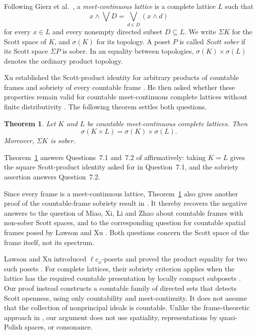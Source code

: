 \documentclass[preprint,11pt]{elsarticle}
\newtheorem{theorem}{Theorem}[section]
\theoremstyle{definition}
\theoremstyle{remark}
\numberwithin{equation}{section}
\newcommand{\Sc}{\sigma}
\newcommand{\Sig}{\Sigma}
\newcommand{\mc}{\wedge}
\begin{document}
Following Gierz et al.\ \cite[Definition~O-4.1]{Gierz}, a \emph{meet-continuous lattice} is a complete lattice $L$ such that
\begin{equation}\label{eq:mc}
 x\mc\bigvee D=\bigvee_{d\in D}(x\mc d)
\end{equation}
for every $x\in L$ and every nonempty directed subset $D\subseteq L$.
We write $\Sig K$ for the Scott space of $K$, and $\Sc(K)$ for its topology. A poset $P$ is called \emph{Scott sober} if its Scott space $\Sig P$ is sober. In an equality between topologies, $\Sc(K)\times\Sc(L)$ denotes the ordinary product topology.

Xu established the Scott-product identity for arbitrary products of countable frames and sobriety of every countable frame \cite[Corollaries~4.4 and~4.9]{XuFrames}. He then asked whether these properties remain valid for countable meet-continuous complete lattices without finite distributivity \cite[Questions~7.1 and~7.2]{XuFrames}. The following theorem settles both questions.

\begin{theorem}\label{thm:main}
Let $K$ and $L$ be countable meet-continuous complete lattices. Then
\[
 \Sc(K\times L)=\Sc(K)\times\Sc(L).
\]
Moreover, $\Sig K$ is sober.
\end{theorem}

Theorem~\ref{thm:main} answers Questions~7.1 and~7.2 of \cite{XuFrames} affirmatively: taking $K=L$ gives the square Scott-product identity asked for in Question~7.1, and the sobriety assertion answers Question~7.2.

Since every frame is a meet-continuous lattice, Theorem~\ref{thm:main} also gives another proof of the countable-frame sobriety result in \cite[Corollary~4.9]{XuFrames}. It thereby recovers the negative answers to the question of Miao, Xi, Li and Zhao \cite[Section~5, p.~830]{Miao} about countable frames with non-sober Scott spaces, and to the corresponding question for countable spatial frames posed by Lawson and Xu \cite[Question~6.2]{LawsonXu}. Both questions concern the Scott space of the frame itself, not its spectrum.

Lawson and Xu introduced $\ell c_\omega$-posets and proved the product equality for two such posets \cite[Definition~4.6 and Theorem~4.10]{LawsonXu}. For complete lattices, their sobriety criterion applies when the lattice has the required countable presentation by locally compact subposets \cite[Theorem~5.13, conditions~(v) and~(a)]{LawsonXu}. Our proof instead constructs a countable family of directed sets that detects Scott openness, using only countability and meet-continuity. It does not assume that the collection of nonprincipal ideals is countable. Unlike the frame-theoretic approach in \cite[Sections~3 and~4]{XuFrames}, our argument does not use spatiality, representations by quasi-Polish spaces, or consonance.
\end{document}
